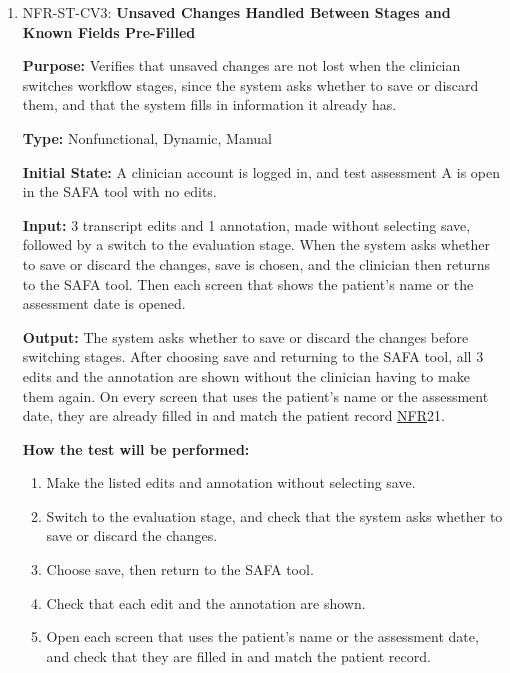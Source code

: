 \documentclass[12pt, titlepage]{article}
\newcommand{\srsnfr}[1]{\href{https://github.com/Nour-Fawaz/MacaBoca/blob/main/pdfs/SRS/SRS.pdf}{NFR}}
\renewcommand{\_}{\oldunderscore\allowbreak}
\begin{document}
\begin{enumerate}
  \item NFR-ST-CV3: \textbf{Unsaved Changes Handled Between Stages and Known Fields Pre-Filled\\}
  \begin{mdframed}[linewidth=0.5mm]
      \textbf{Purpose:} Verifies that unsaved changes are not lost when the clinician switches workflow stages, since the system asks whether to save or discard them, and that the system fills in information it already has. \par
      \textbf{Type:} Nonfunctional, Dynamic, Manual \par
      \textbf{Initial State:} A clinician account is logged in, and test assessment A is open in the SAFA tool with no edits. \par
      \textbf{Input:} 3 transcript edits and 1 annotation, made without selecting save, followed by a switch to the evaluation stage. When the system asks whether to save or discard the changes, save is chosen, and the clinician then returns to the SAFA tool. Then each screen that shows the patient's name or the assessment date is opened. \par
      \textbf{Output:} The system asks whether to save or discard the changes before switching stages. After choosing save and returning to the SAFA tool, all 3 edits and the annotation are shown without the clinician having to make them again. On every screen that uses the patient's name or the assessment date, they are already filled in and match the patient record \srsnfr*{21}. \par
      \textbf{How the test will be performed:}
      \begin{enumerate}
        \item[1.] Make the listed edits and annotation without selecting save.
        \item[2.] Switch to the evaluation stage, and check that the system asks whether to save or discard the changes.
        \item[3.] Choose save, then return to the SAFA tool.
        \item[4.] Check that each edit and the annotation are shown.
        \item[5.] Open each screen that uses the patient's name or the assessment date, and check that they are filled in and match the patient record.
      \end{enumerate}
  \end{mdframed}
\end{enumerate}
\end{document}
